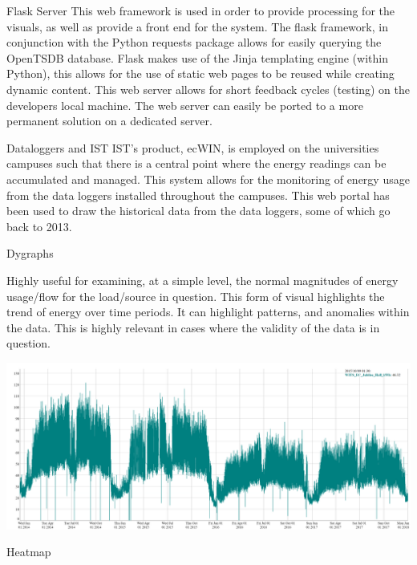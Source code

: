\documentclass[8pt,xcolor={dvipsnames}]{beamer}
\begin{document}
{\begin{frame}{Flask Server}
This web framework is used in order to provide processing for the visuals, as well as provide a front end for the system.
The flask framework, in conjunction with the Python requests package allows for easily querying the OpenTSDB database.
Flask makes use of the Jinja templating engine (within Python), this allows for the use of static web pages to be reused while creating dynamic content.
This web server allows for short feedback cycles (testing) on the developers local machine. The web server can easily be ported to a more permanent solution on a dedicated server.

\end{frame}

\begin{frame}{Dataloggers and IST}
IST's product, ecWIN, is employed on the universities campuses such that there is a central point where the energy readings can be accumulated and managed. This system allows for the monitoring of energy usage from the data loggers installed throughout the campuses.
This web portal has been used to draw the historical data from the data loggers, some of which go back to 2013.
\end{frame}

\begin{frame}{Dygraphs}

Highly useful for examining, at a simple level, the normal magnitudes of energy usage/flow for the load/source in question. This form of visual highlights the trend of energy over time periods. It can highlight patterns, and anomalies within the data. This is highly relevant in cases where the validity of the data is in question.
	\begin{center}
		\includegraphics[width=\textwidth, trim=0 0 0 0, clip]{DygraphsJubilee2014_2018}
	\end{center}
\end{frame}

\begin{frame}{Heatmap}


\end{frame}}
\end{document}
